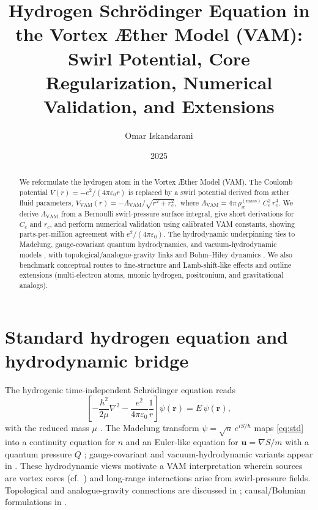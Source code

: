 \documentclass[12pt]{article}
\title{Hydrogen Schr\"odinger Equation in the Vortex \AE ther Model (VAM):\\
Swirl Potential, Core Regularization, Numerical Validation, and Extensions}
\author{Omar Iskandarani}
\date{2025}
\newcommand{\aeRhoM}{\rho_{\text{\ae}}^{(\text{mass})}}
\newcommand{\Ce}{C_e}
\newcommand{\rc}{r_c}
\newcommand{\Lam}{\Lambda_{\text{VAM}}}
\begin{document}
    \maketitle

    \begin{abstract}
        We reformulate the hydrogen atom in the Vortex \AE{}ther Model (VAM). The Coulomb potential
        \(
        V(r)=-e^2/(4\pi\varepsilon_0 r)
        \)
        is replaced by a swirl potential derived from æther fluid parameters,
        \(
        V_{\text{VAM}}(r) = -\Lam/\sqrt{r^2+\rc^2},
        \)
        where
        \(
        \Lam = 4\pi\,\aeRhoM\,\Ce^2\,\rc^4.
        \)
        We derive \(\Lam\) from a Bernoulli swirl-pressure surface integral, give short derivations for \(\Ce\) and \(\rc\), and perform numerical validation using calibrated VAM constants, showing parts-per-million agreement with \(e^2/(4\pi\varepsilon_0)\). The hydrodynamic underpinning ties to Madelung, gauge-covariant quantum hydrodynamics, and vacuum-hydrodynamic models \cite{Madelung1927,Pati2000,Sbitnev2015}, with topological/analogue-gravity links \cite{Kiehn2002,Ranada1995,Barcelo2011} and Bohm--Hiley dynamics \cite{Bohm1952,Hiley2012}. We also benchmark conceptual routes to fine-structure and Lamb-shift-like effects and outline extensions (multi-electron atoms, muonic hydrogen, positronium, and gravitational analogs).
    \end{abstract}

    \section{Standard hydrogen equation and hydrodynamic bridge}
    The hydrogenic time-independent Schr\"odinger equation reads
    \begin{equation}
        \label{eq:std}
        \left[-\frac{\hbar^2}{2\mu}\nabla^2 - \frac{e^2}{4\pi\varepsilon_0}\frac{1}{r}\right]\psi(\mathbf{r})=E\,\psi(\mathbf{r}),
    \end{equation}
    with the reduced mass \(\mu\) \cite{Schrodinger1926a,BetheSalpeter1957}.
    The Madelung transform \(\psi=\sqrt{n}\,e^{iS/\hbar}\) maps \eqref{eq:std} into a continuity equation for \(n\) and an Euler-like equation for \(\mathbf{u}=\nabla S/m\) with a quantum pressure \(Q\) \cite{Madelung1927}; gauge-covariant and vacuum-hydrodynamic variants appear in \cite{Pati2000,Sbitnev2015}. These hydrodynamic views motivate a VAM interpretation wherein sources are vortex cores (cf.\ \cite{Helmholtz1858,Kelvin1867}) and long-range interactions arise from swirl-pressure fields. Topological and analogue-gravity connections are discussed in \cite{Ranada1995,Kiehn2002,Barcelo2011}; causal/Bohmian formulations in \cite{Bohm1952,Hiley2012}.
\end{document}

